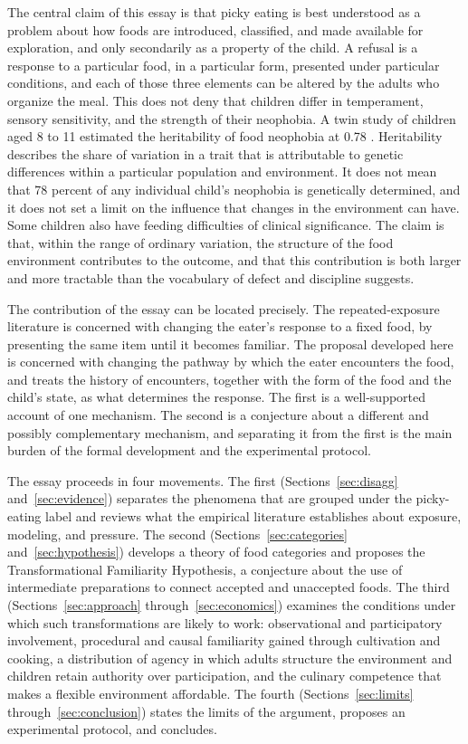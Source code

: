 \documentclass[11pt]{article}
\theoremstyle{remark}
\begin{document}
The central claim of this essay is that picky eating is best understood as a problem about how foods are introduced, classified, and made available for exploration, and only secondarily as a property of the child. A refusal is a response to a particular food, in a particular form, presented under particular conditions, and each of those three elements can be altered by the adults who organize the meal. This does not deny that children differ in temperament, sensory sensitivity, and the strength of their neophobia. A twin study of children aged 8 to 11 estimated the heritability of food neophobia at 0.78 \citep{cooke2007genetic}. Heritability describes the share of variation in a trait that is attributable to genetic differences within a particular population and environment. It does not mean that 78 percent of any individual child's neophobia is genetically determined, and it does not set a limit on the influence that changes in the environment can have. Some children also have feeding difficulties of clinical significance. The claim is that, within the range of ordinary variation, the structure of the food environment contributes to the outcome, and that this contribution is both larger and more tractable than the vocabulary of defect and discipline suggests.

The contribution of the essay can be located precisely. The repeated-exposure literature is concerned with changing the eater's response to a fixed food, by presenting the same item until it becomes familiar. The proposal developed here is concerned with changing the pathway by which the eater encounters the food, and treats the history of encounters, together with the form of the food and the child's state, as what determines the response. The first is a well-supported account of one mechanism. The second is a conjecture about a different and possibly complementary mechanism, and separating it from the first is the main burden of the formal development and the experimental protocol.

The essay proceeds in four movements. The first (Sections~\ref{sec:disagg} and~\ref{sec:evidence}) separates the phenomena that are grouped under the picky-eating label and reviews what the empirical literature establishes about exposure, modeling, and pressure. The second (Sections~\ref{sec:categories} and~\ref{sec:hypothesis}) develops a theory of food categories and proposes the Transformational Familiarity Hypothesis, a conjecture about the use of intermediate preparations to connect accepted and unaccepted foods. The third (Sections~\ref{sec:approach} through~\ref{sec:economics}) examines the conditions under which such transformations are likely to work: observational and participatory involvement, procedural and causal familiarity gained through cultivation and cooking, a distribution of agency in which adults structure the environment and children retain authority over participation, and the culinary competence that makes a flexible environment affordable. The fourth (Sections~\ref{sec:limits} through~\ref{sec:conclusion}) states the limits of the argument, proposes an experimental protocol, and concludes.
\end{document}

